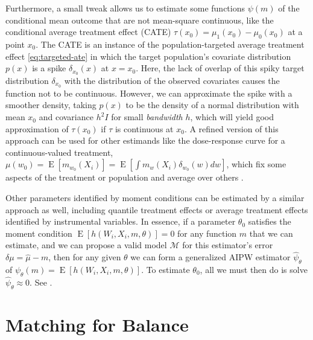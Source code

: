 \documentclass{article}
\theoremstyle{definition}
\DeclareMathOperator{\E}{E}
\newcommand{\estimand}{\psi}
\newcommand{\dm}{\delta \mu}
\newcommand{\model}{\mathcal{M}}
\newcommand{\<}{\langle}
\renewcommand{\>}{\rangle}
\newcommand\cmnt[2]{\;
{\textcolor{red}{[{\em #1 --- #2}] \;}
}}
\newcommand\avi[1]{\cmnt{#1}{Avi}}
\begin{document}
Furthermore, a small tweak allows us to estimate some functions $\estimand(m)$ of the conditional mean outcome that are not mean-square continuous, like the conditional average treatment effect (CATE) $\tau(x_0) = \mu_1(x_0)-\mu_0(x_0)$ at a point $x_0$. The CATE is an instance of the population-targeted average treatment effect \eqref{eq:targeted-ate} in which the target population's covariate distribution $p(x)$ is a spike $\delta_{x_0}(x)$ at $x=x_0$.
Here, the lack of overlap of this spiky target distribution $\delta_{x_0}$ with the distribution of the observed covariates causes the function not to be continuous.
However, we can approximate the spike with a smoother density,
taking $p(x)$ to be the density of a normal distribution with mean $x_0$ and covariance $h^2 I$ for small \emph{bandwidth} $h$, which will yield good approximation of $\tau(x_0)$ if $\tau$ is continuous at $x_0$. A refined version of this approach can be used for other estimands like the dose-response curve for a continuous-valued treatment, $\mu(w_0)=\E[m_{w_0}(X_i)]=\E[\int m_{w}(X_i) \delta_{w_0}(w)dw]$,
which fix some aspects of the treatment or population and average over others \citep[e.g.,][]{chernozhukov2018global, kennedy2017non}.

Other parameters identified by moment conditions can be estimated by a similar approach as well, including quantile treatment effects or average treatment effects identified by instrumental variables.
In essence, if a parameter $\theta_0$ satisfies the moment condition $\E[h(W_i, X_i, m, \theta)] = 0$
for any function $m$ that we can estimate, and we can propose a valid model $\model$ for this estimator's error  $\dm = \hat \mu - m$, then for any given $\theta$ we can form a generalized AIPW estimator $\hat\estimand_{\theta}$ of $\estimand_{\theta}(m) = \E[h(W_i,X_i,m,\theta)]$. To estimate $\theta_0$, all we must then do is solve $\hat \estimand_{\theta} \approx 0$.
See \citet{chernozhukov2016locally, singh2019biased}.




\section{Matching for Balance}
\label{sec:matching}
\end{document}
